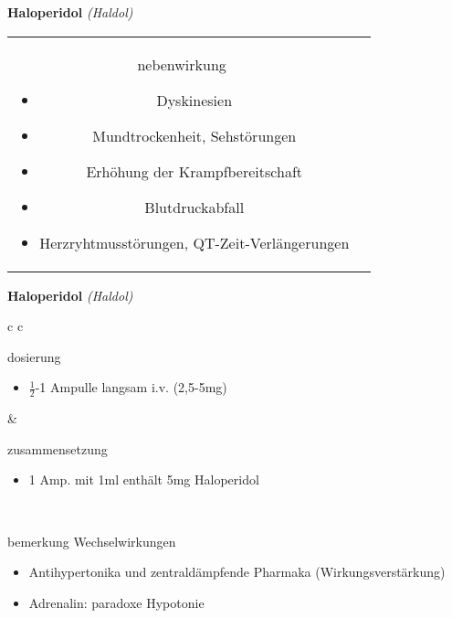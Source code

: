 \begin{frame}{
    \textbf{Haloperidol}
    \textit{(Haldol)}
}
\begin{tabular}{c c}
\begin{beamercolorbox}[wd=\boxwidth\textwidth,ht=\boxheight\textheight,sep=1em]{nebenwirkung}
            \begin{itemize}
                \item Dyskinesien
                \item Mundtrockenheit, Sehstörungen
                \item Erhöhung der Krampfbereitschaft
                \item Blutdruckabfall
                \item Herzryhtmusstörungen, QT-Zeit-Verlängerungen
            \end{itemize}
        \end{beamercolorbox} \\
    \end{tabular}
\end{frame}

\begin{frame}{
    \textbf{Haloperidol}
    \textit{(Haldol)}
}
    \begin{tabular}{c c}
        \begin{beamercolorbox}[wd=\boxwidth\textwidth,ht=\boxheight\textheight,sep=1em]{dosierung}
            \begin{itemize}
                \item $\frac{1}{2}$-1 Ampulle langsam i.v. (2,5-5mg)
            \end{itemize}
        \end{beamercolorbox} & 
        \begin{beamercolorbox}[wd=\boxwidth\textwidth,ht=\boxheight\textheight,sep=1em]{zusammensetzung}
            \begin{itemize}
                \item 1 Amp. mit 1ml enthält 5mg Haloperidol
            \end{itemize}
        \end{beamercolorbox} \\
        \begin{beamercolorbox}[wd=\textwidth,ht=\boxheight\textheight,sep=1em]{bemerkung}
            Wechselwirkungen
            \begin{itemize}
                \item Antihypertonika und zentraldämpfende Pharmaka (Wirkungsverstärkung)
                \item Adrenalin: paradoxe Hypotonie
            \end{itemize}
        \end{beamercolorbox} \\
    \end{tabular}
\end{frame}

